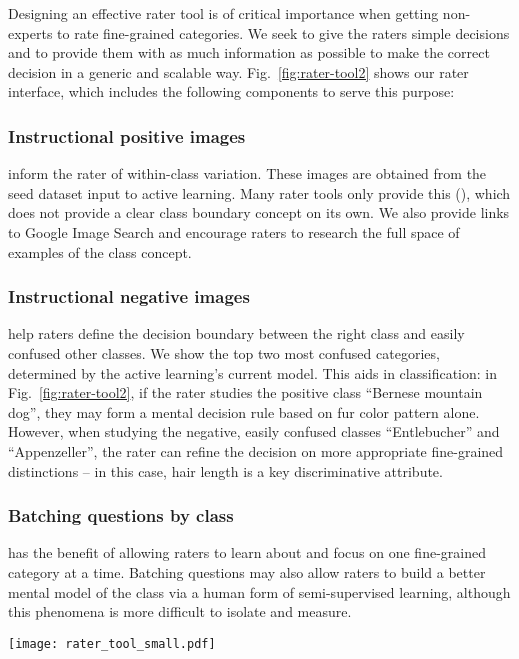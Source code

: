 \documentclass[runningheads]{llncs}
\begin{document}
Designing an effective rater tool is of critical importance when getting non-experts to rate fine-grained categories.
We seek to give the raters simple decisions and to provide them with as much information as possible to make the correct decision in a generic and scalable way.
Fig.~\ref{fig:rater-tool2} shows our rater interface, which includes the following components to serve this purpose:

\subsubsection{Instructional positive images} inform the rater of within-class variation.
These images are obtained from the seed dataset input to active learning.
Many rater tools only provide this (\eg\cite{mscoco}), which does not provide a clear class boundary concept on its own.
We also provide links to Google Image Search and encourage raters to research the full space of examples of the class concept.  

\subsubsection{Instructional negative images} help raters define the decision boundary between the right class and easily confused other classes.
We show the top two most confused categories, determined by the active learning's current model.
This aids in classification: in Fig.~\ref{fig:rater-tool2}, if the rater studies the positive class ``Bernese mountain dog'', they may form a mental decision rule based on fur color pattern alone.
However, when studying the negative, easily confused classes ``Entlebucher'' and ``Appenzeller'', the rater can refine the decision on more appropriate fine-grained distinctions -- in this case, hair length is a key discriminative attribute.

\subsubsection{Batching questions by class} has the benefit of allowing raters to learn about and focus on one fine-grained category at a time.
Batching questions may also allow raters to build a better mental model of the class via a human form of semi-supervised learning, although this phenomena is more difficult to isolate and measure.

\begin{figure*}[t]
\centering
\texttt{[image: rater\_tool\_small.pdf]}
\caption[Rater labeling tool] {
\label{fig:rater-tool2}
Our tool for binary annotation of fine-grained categories.
Instructional positive images are provided in the upper left and negatives are provided in the lower left.  This is a higher-resolution version of the figure in the main text.
}
\end{figure*}
\end{document}
